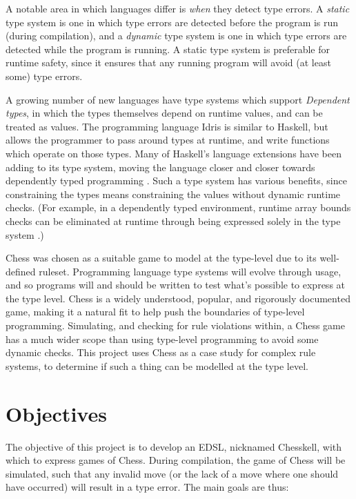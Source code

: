 \documentclass[12pt, a4paper, bibliography=totocnumbered]{scrreprt}
\begin{document}
A notable area in which languages differ is \emph{when} they detect type errors. A \emph{static} type system is one in which type errors are detected before the program is run (during compilation), and a \emph{dynamic} type system is one in which type errors are detected while the program is running. A static type system is preferable for runtime safety, since it ensures that any running program will avoid (at least some) type errors.

A growing number of new languages have type systems which support \emph{Dependent types}, in which the types themselves depend on runtime values, and can be treated as values. The programming language Idris is similar to Haskell, but allows the programmer to pass around types at runtime, and write functions which operate on those types. Many of Haskell's language extensions have been adding to its type system, moving the language closer and closer towards dependently typed programming \cite{singletons}. Such a type system has various benefits, since constraining the types means constraining the values without dynamic runtime checks. (For example, in a dependently typed environment, runtime array bounds checks can be eliminated at runtime through being expressed solely in the type system \cite{dependentarray}.)

Chess was chosen as a suitable game to model at the type-level due to its well-defined ruleset. Programming language type systems will evolve through usage, and so programs will and should be written to test what's possible to express at the type level. Chess is a widely understood, popular, and rigorously documented game, making it a natural fit to help push the boundaries of type-level programming. Simulating, and checking for rule violations within, a Chess game has a much wider scope than using type-level programming to avoid some dynamic checks. This project uses Chess as a case study for complex rule systems, to determine if such a thing can be modelled at the type level.

\chapter{Objectives}

The objective of this project is to develop an EDSL, nicknamed Chesskell, with which to express games of Chess. During compilation, the game of Chess will be simulated, such that any invalid move (or the lack of a move where one should have occurred) will result in a type error. The main goals are thus:
\end{document}
